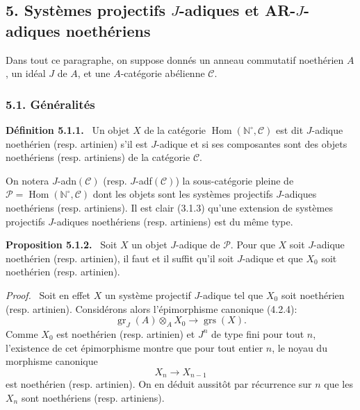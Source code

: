 \documentclass[11pt]{article}
\newenvironment{statement}[1]{\par\medskip\noindent\textbf{#1.}\ }{\par\medskip}
\newenvironment{prooftext}[1][Proof]{\par\noindent\emph{#1.}\ }{\par\medskip}
\DeclareMathOperator{\Hom}{Hom}
\providecommand{\gr}{\operatorname{gr}}
\providecommand{\Hom}{\operatorname{Hom}}
\providecommand{\gr}{\operatorname{gr}}
\providecommand{\gr}{\operatorname{gr}}
\providecommand{\grs}{\operatorname{grs}}
\providecommand{\Hom}{\operatorname{Hom}}
\begin{document}
\subsection*{5. Systèmes projectifs \(J\)-adiques et AR-\(J\)-adiques noethériens}

Dans tout ce paragraphe, on suppose donnés un anneau commutatif noethérien \(A\), un idéal \(J\) de \(A\), et une \(A\)-catégorie abélienne \(\mathcal C\).

\subsubsection*{5.1. Généralités}

\begin{statement}{Définition 5.1.1}
Un objet \(X\) de la catégorie \(\Hom(\mathbb N^\circ,\mathcal C)\) est dit \(J\)-adique noethérien (resp. artinien) s'il est \(J\)-adique et si ses composantes sont des objets noethériens (resp. artiniens) de la catégorie \(\mathcal C\).
\end{statement}

On notera \(J\)-adn\((\mathcal C)\) (resp. \(J\)-adf\((\mathcal C)\)) la sous-catégorie pleine de
\(\mathcal P=\Hom(\mathbb N^\circ,\mathcal C)\) dont les objets sont les systèmes projectifs \(J\)-adiques noethériens (resp. artiniens). Il est clair (3.1.3) qu'une extension de systèmes projectifs \(J\)-adiques noethériens (resp. artiniens) est du même type.

\begin{statement}{Proposition 5.1.2}
Soit \(X\) un objet \(J\)-adique de \(\mathcal P\). Pour que \(X\) soit \(J\)-adique noethérien (resp. artinien), il faut et il suffit qu'il soit \(J\)-adique et que \(X_0\) soit noethérien (resp. artinien).
\end{statement}

\begin{prooftext}
Soit en effet \(X\) un système projectif \(J\)-adique tel que \(X_0\) soit noethérien (resp. artinien). Considérons alors l'épimorphisme canonique (4.2.4):
\[
\gr_J(A)\otimes_A X_0\longrightarrow \grs(X).
\]
Comme \(X_0\) est noethérien (resp. artinien) et \(J^n\) de type fini pour tout \(n\), l'existence de cet épimorphisme montre que pour tout entier \(n\), le noyau du morphisme canonique
\[
X_n\longrightarrow X_{n-1}
\]
est noethérien (resp. artinien). On en déduit aussitôt par récurrence sur \(n\) que les \(X_n\) sont noethériens (resp. artiniens).
\end{prooftext}
\end{document}
